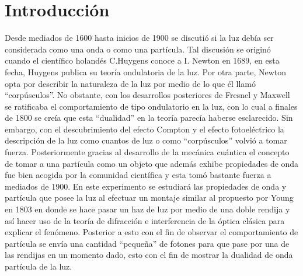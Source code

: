 \documentclass[%
 reprint,
 amsmath,amssymb,
 aps,
]{revtex4-1}
\begin{document}
\section{Introducción}
Desde mediados de 1600 hasta inicios de 1900 se discutió si la luz debía ser considerada como una onda o como una partícula. Tal discusión se originó cuando el científico holandés C.Huygens conoce a  I. Newton en 1689, en esta fecha, Huygens publica su  teoría ondulatoria de la luz. Por otra parte, Newton opta por describir la naturaleza de la luz por medio de lo que él llamó “corpúsculos”. No obstante, con los desarrollos posteriores de Fresnel y Maxwell se ratificaba el comportamiento de tipo ondulatorio en la luz, con lo cual a finales de 1800 se creía que esta “dualidad” en la teoría parecía haberse esclarecido. Sin embargo, con el descubrimiento del efecto Compton y el efecto fotoeléctrico la descripción de la luz como cuantos de luz o como “corpúsculos” volvió a tomar fuerza. Posteriormente gracias al desarrollo de la mecánica cuántica el concepto de tomar a una partícula como un objeto que además exhibe propiedades de onda fue bien acogida por la comunidad científica y esta tomó bastante fuerza a mediados de 1900. En este experimento se estudiará las propiedades de onda y partícula que posee la luz al efectuar un montaje similar al propuesto por Young en 1803 en donde se hace pasar un haz de luz por medio de una doble rendija y así hacer uso de la teoría de difracción e interferencia de la óptica clásica para explicar el fenómeno. Posterior a esto con el fin de observar el comportamiento de partícula se envía una cantidad “pequeña” de fotones para que pase por una de las rendijas en un momento dado, esto con el fin de mostrar la dualidad de onda partícula de la luz.
\end{document}

